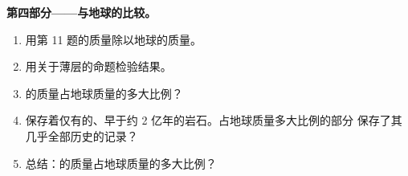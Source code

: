 \begin{problem}
\medskip
\noindent\textbf{第四部分——与地球的比较。}
\begin{enumerate}[resume]
  \item 用第 11 题的质量除以地球的质量。
  \item 用关于薄层的命题检验结果。
  \item {}的质量占地球质量的多大比例？
  \item {}保存着仅有的、早于约
        2 亿年的岩石。占地球质量多大比例的部分
        保存了其几乎全部历史的记录？
  \item 总结：的质量占地球质量的多大比例？
\end{enumerate}
\end{problem}
